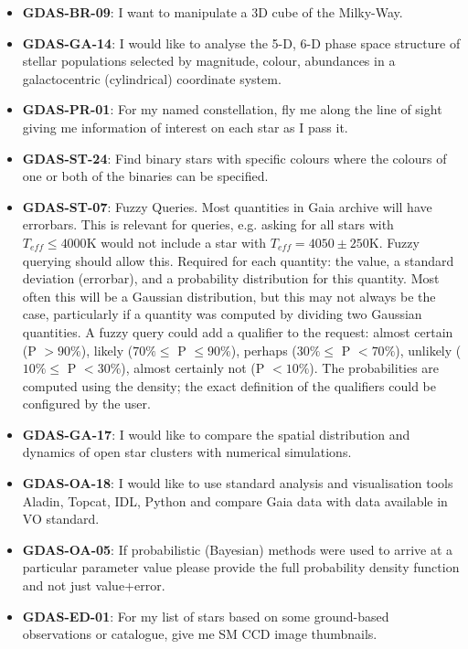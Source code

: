 \documentclass[longauth, final]{aa}
\begin{document}
\begin{itemize}
\item{\bf GDAS-BR-09}: I want to manipulate a 3D cube of the Milky-Way. 

\item{\bf GDAS-GA-14}: I would like to analyse the 5-D, 6-D phase space structure of stellar populations selected by magnitude, colour, abundances in a galactocentric (cylindrical) coordinate system. 

\item{\bf GDAS-PR-01}: For my named constellation, fly me along the line of sight giving me information of interest on each star as I pass it. 

\item{\bf GDAS-ST-24}: Find binary stars with specific colours  where the colours of one or both of the binaries can be specified.

\item{\bf GDAS-ST-07}: Fuzzy Queries. 
Most quantities in Gaia archive will have errorbars. This is relevant for queries, e.g. asking for all stars with $T_{eff}\le 4000$K would not include a star with $T_{eff} = 4050 \pm 250$K. Fuzzy querying should allow this. Required for each quantity: the value, a standard deviation (errorbar), and a probability distribution for this quantity. Most often this will be a Gaussian distribution, but this may not always be the case, particularly if a quantity was computed by dividing two Gaussian quantities. A fuzzy query could add a qualifier to the request: almost certain (P $> 90\%$), likely ($70\% \le$ P $\le 90\%$), perhaps ($30\% \le$ P $ < 70\%$), unlikely ($10\% \le$ P $ < 30\%$), almost certainly not (P $ < 10\%$). The probabilities are computed using the density; the exact definition of the qualifiers could be configured by the user. 

\item{\bf GDAS-GA-17}:  I would like to compare the spatial distribution and dynamics of open star clusters with numerical simulations. 

\item{\bf GDAS-OA-18}: I would like to use standard analysis and visualisation tools Aladin, Topcat, IDL, Python and compare Gaia data with data available in VO standard. 

\item{\bf GDAS-OA-05}: If probabilistic (Bayesian) methods were used to arrive at a particular parameter value please provide the full probability density function and not just value+error. 

\item{\bf GDAS-ED-01}: For my list of stars based on some ground-based observations or catalogue, give me SM CCD image thumbnails. 


\end{itemize}
\end{document}
